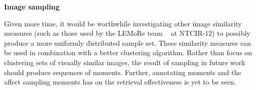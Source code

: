 \textbf{Image sampling}

Given more time, it would be worthwhile investigating other image similarity measures (such as those used by the LEMoRe team ~\cite{de40lemore} at NTCIR-12) to possibly produce a more uniformly distributed sample set. These similarity measures can be used in combination with a better clustering algorithm. Rather than focus on clustering sets of visually similar images, the result of sampling in future work should produce sequences of moments. Further, annotating moments and the affect sampling moments has on the retrieval effectiveness is yet to be seen.

 
 

